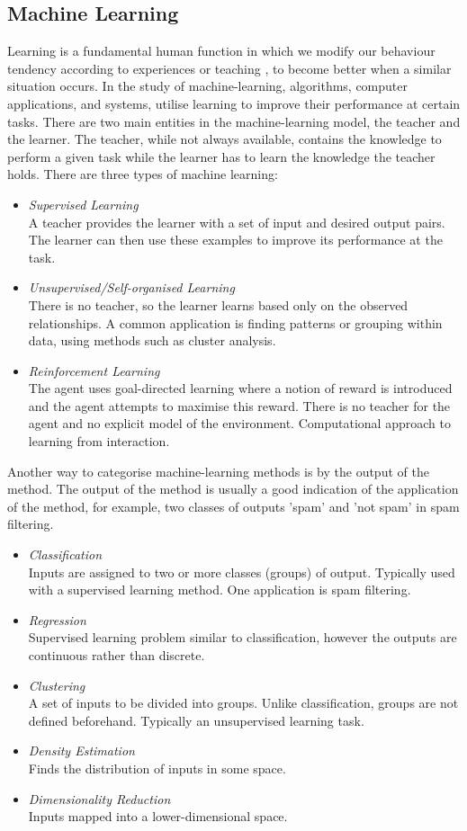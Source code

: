 \documentclass[11pt,a4paper]{article}
\begin{document}
\subsection{Machine Learning}
Learning is a fundamental human function in which we modify our behaviour tendency according to experiences or teaching \cite{michalski}, to become better when a similar situation occurs. In the study of machine-learning, algorithms, computer applications, and systems, utilise learning to improve their performance at certain tasks. There are two main entities in the machine-learning model, the teacher and the learner. The teacher, while not always available, contains the knowledge to perform a given task while the learner has to learn the knowledge the teacher holds. \cite{swarmann} There are three types of machine learning:
\begin{itemize}
\item \emph{Supervised Learning}\\
A teacher provides the learner with a set of input and desired output pairs. The learner can then use these examples to improve its performance at the task.
\item \emph{Unsupervised/Self-organised Learning}\\
There is no teacher, so the learner learns based only on the observed relationships. A common application is finding patterns or grouping within data, using methods such as cluster analysis.
\item \emph{Reinforcement Learning}\\
The agent uses goal-directed learning where a notion of reward is introduced and the agent attempts to maximise this reward. There is no teacher for the agent and no explicit model of the environment. Computational approach to learning from interaction. \cite{reinforce}
\end{itemize}
\newpage
Another way to categorise machine-learning methods is by the output of the method. The output of the method is usually a good indication of the application of the method, for example, two classes of outputs 'spam' and 'not spam' in spam filtering. 
\begin{itemize}
\item \emph{Classification}\\
Inputs are assigned to two or more classes (groups) of output. Typically used with a supervised learning method. One application is spam filtering.
\item \emph{Regression}\\
Supervised learning problem similar to classification, however the outputs are continuous rather than discrete.
\item \emph{Clustering}\\
A set of inputs to be divided into groups. Unlike classification, groups are not defined beforehand. Typically an unsupervised learning task.
\item \emph{Density Estimation}\\
Finds the distribution of inputs in some space.
\item \emph{Dimensionality Reduction}\\
Inputs mapped into a lower-dimensional space.\\
\end{itemize}
\end{document}
